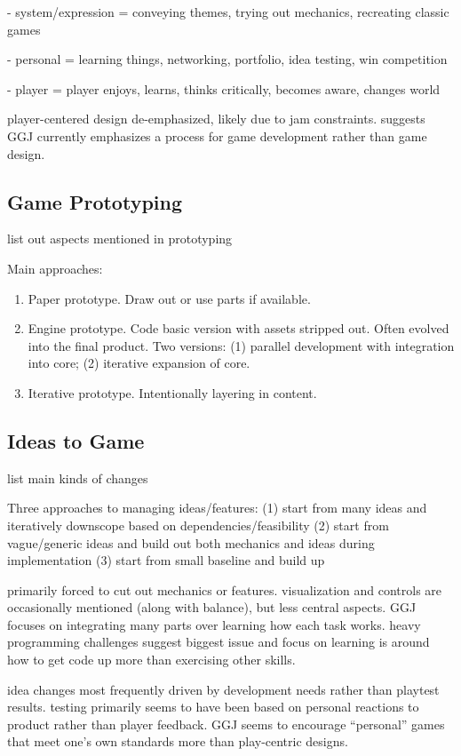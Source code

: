 \documentclass{sig-alternate}
\begin{document}
- system/expression = conveying themes, trying out mechanics, recreating classic games

- personal = learning things, networking, portfolio, idea testing, win competition

- player = player enjoys, learns, thinks critically, becomes aware, changes world

player-centered design de-emphasized, likely due to jam constraints. suggests GGJ currently emphasizes a process for game development rather than game design.

\subsection{Game Prototyping}
list out aspects mentioned in prototyping

Main approaches:
\begin{enumerate}
\item Paper prototype. Draw out or use parts if available.
\item Engine prototype. Code basic version with assets stripped out. Often evolved into the final product. Two versions: (1) parallel development with integration into core; (2) iterative expansion of core.
\item Iterative prototype. Intentionally layering in content.
\end{enumerate}

\subsection{Ideas to Game}
list main kinds of changes

Three approaches to managing ideas/features: 
(1) start from many ideas and iteratively downscope based on dependencies/feasibility
(2) start from vague/generic ideas and build out both mechanics and ideas during implementation
(3) start from small baseline and build up

primarily forced to cut out mechanics or features. visualization and controls are occasionally mentioned (along with balance), but less central aspects. GGJ focuses on integrating many parts over learning how each task works. heavy programming challenges suggest biggest issue and focus on learning is around how to get code up more than exercising other skills.

idea changes most frequently driven by development needs rather than playtest results. testing primarily seems to have been based on personal reactions to product rather than player feedback. GGJ seems to encourage ``personal'' games that meet one's own standards more than play-centric designs. 
\end{document}
